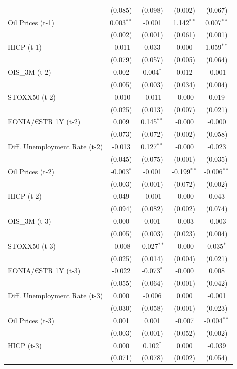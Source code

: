 \begin{longtable}[t]{lcccc}
 & (0.085) & (0.098) & (0.002) & (0.067)\\
Oil Prices (t-1) & 0.003$^{**}$ & -0.001 & 1.142$^{**}$ & 0.007$^{**}$\\
 & (0.002) & (0.001) & (0.061) & (0.001)\\
HICP (t-1) & -0.011 & 0.033 & 0.000 & 1.059$^{**}$\\
 & (0.079) & (0.057) & (0.005) & (0.064)\\
OIS\_3M (t-2) & 0.002 & 0.004$^{*}$ & 0.012 & -0.001\\
 & (0.005) & (0.003) & (0.034) & (0.004)\\
STOXX50 (t-2) & -0.010 & -0.011 & -0.000 & 0.019\\
 & (0.025) & (0.013) & (0.007) & (0.021)\\
EONIA/€STR 1Y (t-2) & 0.009 & 0.145$^{**}$ & -0.000 & -0.000\\
 & (0.073) & (0.072) & (0.002) & (0.058)\\
Diff. Unemployment Rate (t-2) & -0.013 & 0.127$^{**}$ & -0.000 & -0.023\\
 & (0.045) & (0.075) & (0.001) & (0.035)\\
Oil Prices (t-2) & -0.003$^{*}$ & -0.001 & -0.199$^{**}$ & -0.006$^{**}$\\
 & (0.003) & (0.001) & (0.072) & (0.002)\\
HICP (t-2) & 0.049 & -0.001 & -0.000 & 0.043\\
 & (0.094) & (0.082) & (0.002) & (0.074)\\
OIS\_3M (t-3) & 0.000 & 0.001 & -0.003 & -0.003\\
 & (0.005) & (0.003) & (0.023) & (0.004)\\
STOXX50 (t-3) & -0.008 & -0.027$^{**}$ & -0.000 & 0.035$^{*}$\\
 & (0.025) & (0.014) & (0.004) & (0.021)\\
EONIA/€STR 1Y (t-3) & -0.022 & -0.073$^{*}$ & -0.000 & 0.008\\
 & (0.055) & (0.064) & (0.001) & (0.042)\\
Diff. Unemployment Rate (t-3) & 0.000 & -0.006 & 0.000 & -0.001\\
 & (0.030) & (0.058) & (0.001) & (0.023)\\
Oil Prices (t-3) & 0.001 & 0.001 & -0.007 & -0.004$^{**}$\\
 & (0.003) & (0.001) & (0.052) & (0.002)\\
HICP (t-3) & 0.000 & 0.102$^{*}$ & 0.000 & -0.039\\
 & (0.071) & (0.078) & (0.002) & (0.054)\\

\end{longtable}
